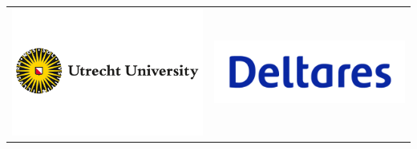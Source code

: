 \begin{table}
\begin{tabular}{cc}
        \includegraphics[width = 2.5in]{figures/utrechtlogo.png} &
        \includegraphics[width = 2.5in]{figures/deltareslogo.png}\\
    \end{tabular}
\end{table}
